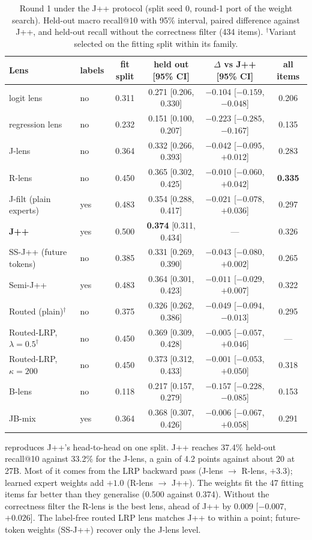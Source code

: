 \documentclass[11pt]{article}
\theoremstyle{definition}
\begin{document}
\begin{table}[t]
\centering
\caption{Round 1 under the J++ protocol (split seed 0, round-1 port of the weight search). Held-out
macro recall@10 with 95\% interval, paired difference against J++, and held-out recall without the
correctness filter (434 items). $^\dagger$Variant selected on the fitting split within its family.}
\label{tab:round1}
\small
\begin{tabular}{llcccc}
\toprule
Lens & labels & fit split & held out [95\% CI] & $\Delta$ vs J++ [95\% CI] & all items \\
\midrule
logit lens & no & 0.311 & 0.271 [0.206, 0.330] & $-0.104$ [$-0.159$, $-0.048$] & 0.206 \\
regression lens & no & 0.232 & 0.151 [0.100, 0.207] & $-0.223$ [$-0.285$, $-0.167$] & 0.135 \\
J-lens & no & 0.364 & 0.332 [0.266, 0.393] & $-0.042$ [$-0.095$, $+0.012$] & 0.283 \\
R-lens & no & 0.450 & 0.365 [0.302, 0.425] & $-0.010$ [$-0.060$, $+0.042$] & \textbf{0.335} \\
J-filt (plain experts) & yes & 0.483 & 0.354 [0.288, 0.417] & $-0.021$ [$-0.078$, $+0.036$] & 0.297 \\
\textbf{J++} & yes & 0.500 & \textbf{0.374} [0.311, 0.434] & --- & 0.326 \\
\addlinespace
SS-J++ (future tokens) & no & 0.385 & 0.331 [0.269, 0.390] & $-0.043$ [$-0.080$, $+0.002$] & 0.265 \\
Semi-J++ & yes & 0.483 & 0.364 [0.301, 0.423] & $-0.011$ [$-0.029$, $+0.007$] & 0.322 \\
Routed (plain)$^\dagger$ & no & 0.375 & 0.326 [0.262, 0.386] & $-0.049$ [$-0.094$, $-0.013$] & 0.295 \\
Routed-LRP, $\lambda=0.5^\dagger$ & no & 0.450 & 0.369 [0.309, 0.428] & $-0.005$ [$-0.057$, $+0.046$] & --- \\
Routed-LRP, $\kappa=200$ & no & 0.450 & 0.373 [0.312, 0.433] & $-0.001$ [$-0.053$, $+0.050$] & 0.318 \\
B-lens & no & 0.118 & 0.217 [0.157, 0.279] & $-0.157$ [$-0.228$, $-0.085$] & 0.153 \\
JB-mix & yes & 0.364 & 0.368 [0.307, 0.426] & $-0.006$ [$-0.067$, $+0.058$] & 0.291 \\
\bottomrule
\end{tabular}
\end{table}

 reproduces J++'s head-to-head on one split. J++ reaches 37.4\% held-out recall@10
against 33.2\% for the J-lens, a gain of 4.2 points against about 20 at 27B. Most of it comes from the
LRP backward pass (J-lens $\to$ R-lens, $+3.3$); learned expert weights add $+1.0$ (R-lens $\to$
J++). The weights fit the 47 fitting items far better than they generalise (0.500 against 0.374).
Without the correctness filter the R-lens is the best lens, ahead of J++ by 0.009
[$-0.007$, $+0.026$]. The label-free routed LRP lens matches J++ to within a point; future-token
weights (SS-J++) recover only the J-lens level.
\end{document}
